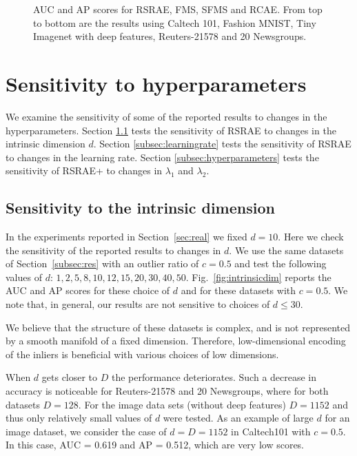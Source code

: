 \documentclass{article} \usepackage{iclr2020_conference,times}
\def\Secref#1{Section~\ref{#1}}
\begin{document}
\begin{figure}[htbp]
\caption{AUC and AP scores for RSRAE, FMS, SFMS and RCAE. From top to bottom are the results using Caltech 101, Fashion MNIST, Tiny Imagenet with deep features, Reuters-21578 and 20 Newsgroups.}
\label{fig:RSRandRCAE}

\end{figure}




\newpage
\section{Sensitivity to hyperparameters}
\label{sec:sensitivity}

We examine the sensitivity of some of the reported results to changes in the hyperparameters. Section \ref{subsec:intrinsicdim} tests the sensitivity of RSRAE to changes in the intrinsic dimension $d$.
Section \ref{subsec:learningrate} tests the sensitivity of RSRAE to changes in the learning rate. 
Section \ref{subsec:hyperparameters} tests the sensitivity of RSRAE+ to changes in $\lambda_1$ and $\lambda_2$. 



\subsection{Sensitivity to the intrinsic dimension}
\label{subsec:intrinsicdim}

In the experiments reported in \Secref{sec:real} we fixed $d=10$. Here we check the sensitivity of the reported results to changes in $d$.
We use the same datasets of \Secref{subsec:res} with an outlier ratio of $c=0.5$ and test the following values of $d$: $1,2,5,8,10,12,15,20,30,40,50$.  Fig.~\ref{fig:intrinsicdim} reports the AUC and AP scores for these choice of $d$ and for these datasets with $c=0.5$. 
We note that, in general, our results are not  sensitive to choices of $d \leq 30$.

We believe that the structure of these datasets is complex, and is not represented by a smooth manifold of a fixed dimension. Therefore, low-dimensional encoding of the inliers is beneficial with various choices of low dimensions. 

When $d$ gets closer to $D$ the performance deteriorates. Such a decrease in accuracy is noticeable for Reuters-21578 and 20 Newsgroups, where for both datasets $D=128$. For the image data sets (without deep features) $D = 1152$ and thus only relatively small values of $d$ were tested. As an example of large $d$ for an image dataset, we consider the case of $d=D=1152$ in Caltech101 with $c=0.5$. In this case, AUC = 0.619 and AP = 0.512, which are very low scores. 
\end{document}
